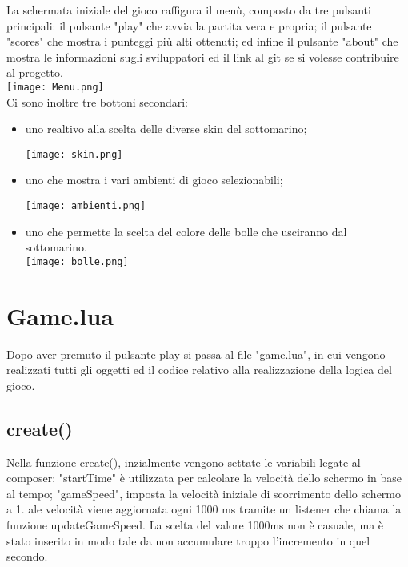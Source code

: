 \documentclass[12pt]{article}
\begin{document}
La schermata iniziale del gioco raffigura il menù, composto da tre pulsanti principali: il pulsante "play" che avvia la partita vera e propria; il pulsante "scores" che mostra i punteggi più alti ottenuti; ed infine il pulsante "about" che mostra le informazioni sugli sviluppatori ed il link al git se si volesse contribuire al progetto. \\

\texttt{[image: Menu.png]}\\
Ci sono inoltre tre bottoni secondari: 
\begin{itemize}
    \item uno realtivo alla scelta delle diverse skin del sottomarino; 

\texttt{[image: skin.png]}\\

    \item uno che mostra i vari ambienti di gioco selezionabili; 

\texttt{[image: ambienti.png]}\\

    \item uno che permette la scelta del colore delle bolle che usciranno dal sottomarino. 
\\

\texttt{[image: bolle.png]}\\

\end{itemize}
\section{Game.lua}
Dopo aver premuto il pulsante play si passa al file "game.lua", in cui vengono realizzati tutti gli oggetti ed il codice relativo 
alla realizzazione della logica del gioco. 
\subsection{create()}
Nella funzione create(), inzialmente vengono settate le variabili legate al composer: "startTime" è utilizzata per calcolare la 
velocità dello schermo in base al tempo; "gameSpeed", imposta la velocità iniziale di scorrimento dello schermo a 1. 
ale velocità viene aggiornata ogni 1000 ms tramite un listener che chiama la funzione updateGameSpeed. 
La scelta del valore 1000ms non è casuale, ma è stato inserito in modo tale da non accumulare troppo l'incremento in quel secondo.
\\
\end{document}
